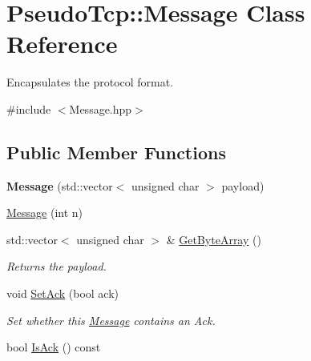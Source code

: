\hypertarget{classPseudoTcp_1_1Message}{
\section{PseudoTcp::Message Class Reference}
\label{classPseudoTcp_1_1Message}
}


Encapsulates the protocol format.  




{\ttfamily \#include $<$Message.hpp$>$}

\subsection*{Public Member Functions}
\begin{DoxyCompactItemize}
\item 
\hypertarget{classPseudoTcp_1_1Message_a638940a04839b0562f290f889241d024}{
{\bfseries Message} (std::vector$<$ unsigned char $>$ payload)}
\label{classPseudoTcp_1_1Message_a638940a04839b0562f290f889241d024}

\item 
\hyperlink{classPseudoTcp_1_1Message_a9adbafc6e615e070f8e0ef861a507421}{Message} (int n)
\item 
\hypertarget{classPseudoTcp_1_1Message_af505c01b16ce8a4df996328ec57e23de}{
std::vector$<$ unsigned char $>$ \& \hyperlink{classPseudoTcp_1_1Message_af505c01b16ce8a4df996328ec57e23de}{GetByteArray} ()}
\label{classPseudoTcp_1_1Message_af505c01b16ce8a4df996328ec57e23de}

\begin{DoxyCompactList}\small\item\em Returns the payload. \item\end{DoxyCompactList}\item 
\hypertarget{group__group1_gaefd21c9f3d668b1e918bed1784afab84}{
void \hyperlink{group__group1_gaefd21c9f3d668b1e918bed1784afab84}{SetAck} (bool ack)}
\label{group__group1_gaefd21c9f3d668b1e918bed1784afab84}

\begin{DoxyCompactList}\small\item\em Set whether this \hyperlink{classPseudoTcp_1_1Message}{Message} contains an Ack. \item\end{DoxyCompactList}\item 
\hypertarget{group__group1_ga6b3b9a3bccbaa08efa0ebfdbf6222581}{
bool \hyperlink{group__group1_ga6b3b9a3bccbaa08efa0ebfdbf6222581}{IsAck} () const }
\label{group__group1_ga6b3b9a3bccbaa08efa0ebfdbf6222581}


\end{DoxyCompactItemize}
